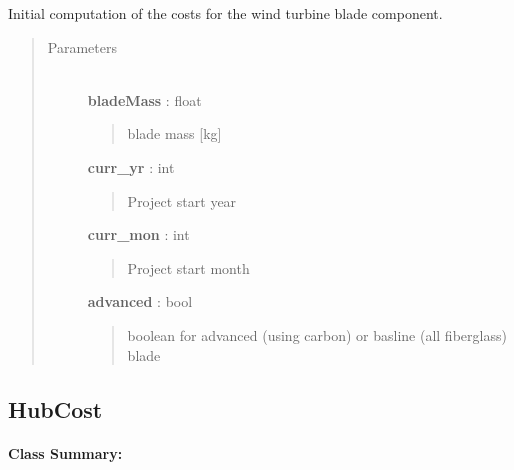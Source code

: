 \documentclass[letterpaper,10pt,openany,oneside]{sphinxmanual}
\begin{document}
\begin{fulllineitems}
\label{documentation:turbine_costSE.src.rotor_costsSE.BladeCost}
Initial computation of the costs for the wind turbine blade component.
\begin{quote}\begin{description}
\item[{Parameters }] \leavevmode\\
\textbf{bladeMass} : float
\begin{quote}

blade mass {[}kg{]}
\end{quote}

\textbf{curr\_yr} : int
\begin{quote}

Project start year
\end{quote}

\textbf{curr\_mon} : int
\begin{quote}

Project start month
\end{quote}

\textbf{advanced} : bool
\begin{quote}

boolean for advanced (using carbon) or basline (all fiberglass) blade
\end{quote}

\end{description}\end{quote}

\end{fulllineitems}



\subsection{HubCost}
\label{documentation:hubcost-class-label}\label{documentation:hubcost}\paragraph{Class Summary:}
\end{document}
